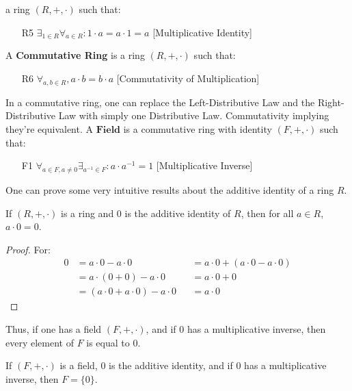 \documentclass[crop=false,class=book,oneside]{standalone}
\begin{document}
        a ring $(R,+,\cdot)$ such that:
        \begin{enumerate}
            \item[R5] $\exists_{1\in{R}}\forall_{a\in{R}}:%
                       1\cdot{a}=a\cdot{1}=a$
                      \hfill[Multiplicative Identity]
        \end{enumerate}
        A \textbf{Commutative Ring} is a ring $(R,+,\cdot)$
        such that:
        \begin{enumerate}
            \item[R6] $\forall_{a,b\in{R}},a\cdot{b}=b\cdot{a}$
                      \hfill[Commutativity of Multiplication]
        \end{enumerate}
        In a commutative ring, one can replace the
        Left-Distributive Law and the Right-Distributive Law with
        simply one Distributive Law. Commutativity implying
        they're equivalent. A $\textbf{Field}$ is a
        commutative ring with identity $(F,+,\cdot)$ such that:
        \begin{enumerate}
            \item[F1] $\forall_{a\in{F}, a\ne{0}}%
                       \exists_{a^{-1}\in{F}}:a\cdot{a^{-1}}=1$
                      \hfill[Multiplicative Inverse]
        \end{enumerate}
        One can prove some very intuitive results about the
        additive identity of a ring $R$.
        \begin{theorem}
            If $(R,+,\cdot)$ is a ring and $0$ is the additive
            identity of $R$, then for all $a\in{R}$,
            $a\cdot{0}=0$.
        \end{theorem}
        \begin{proof}
            For:
            \begin{align*}
                0&=a\cdot{0}-a\cdot{0}
                &
                &=a\cdot{0}+(a\cdot{0}-a\cdot{0})\\
                &=a\cdot(0+0)-a\cdot{0}
                &
                &=a\cdot{0}+0\\
                &=(a\cdot{0}+a\cdot{0})-a\cdot{0}
                &
                &=a\cdot{0}
            \end{align*}
        \end{proof}
        Thus, if one has a field $(F,+,\cdot)$, and if
        $0$ has a multiplicative inverse, then every element of
        $F$ is equal to $0$.
        \begin{theorem}
            If $(F,+,\cdot)$ is a field, $0$ is the additive
            identity, and if $0$ has a multiplicative inverse,
            then $F=\{0\}$.
        \end{theorem}
\end{document}
